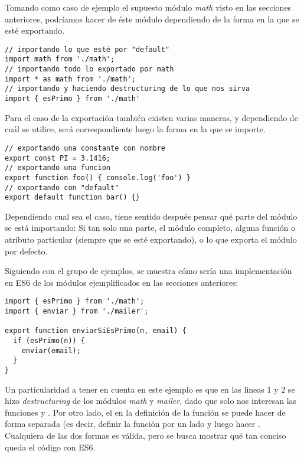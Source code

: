 Tomando como caso de ejemplo el supuesto módulo \textit{math} visto en las secciones anteriores, podríamos hacer  de éste módulo dependiendo de la forma en la que se esté exportando.

\begin{lstlisting}[title={Algunos ejemplos de \code{import}}]
// importando lo que esté por "default" 
import math from './math';
// importando todo lo exportado por math
import * as math from './math';
// importando y haciendo destructuring de lo que nos sirva
import { esPrimo } from './math'
\end{lstlisting}

Para el caso de la exportación también existen varias maneras, y dependiendo de cuál se utilice, será correspondiente luego la forma en la que se importe.

\begin{lstlisting}[title={Algunos ejemplos de \code{export}}]
// exportando una constante con nombre
export const PI = 3.1416;
// exportando una funcion
export function foo() { console.log('foo') }
// exportando con "default"
export default function bar() {}
\end{lstlisting}

Dependiendo cual sea el caso, tiene sentido después pensar qué parte del módulo se está importando: Si tan solo una parte, el módulo completo, alguna función o atributo particular (siempre que se esté exportando), o lo que exporta el módulo por defecto.

Siguiendo con el grupo de ejemplos, se muestra cómo sería una implementación en ES6 de los módulos ejemplificados en las secciones anteriores:

\begin{lstlisting}[title={Ejemplo de módulo en ES6}]
import { esPrimo } from './math';
import { enviar } from './mailer';

export function enviarSiEsPrimo(n, email) {
  if (esPrimo(n)) {
    enviar(email);
  }
}
\end{lstlisting}

Un particularidad a tener en cuenta en este ejemplo es que en las lineas 1 y 2 se hizo \textit{destructuring} de los módulos \textit{math} y \textit{mailer}, dado que solo nos interesan las funciones  y . Por otro lado, el  en la definición de la función se puede hacer de forma separada (es decir, definir la función por un lado y luego hacer . Cualquiera de las dos formas es válida, pero se busca mostrar qué tan conciso queda el código con ES6.

